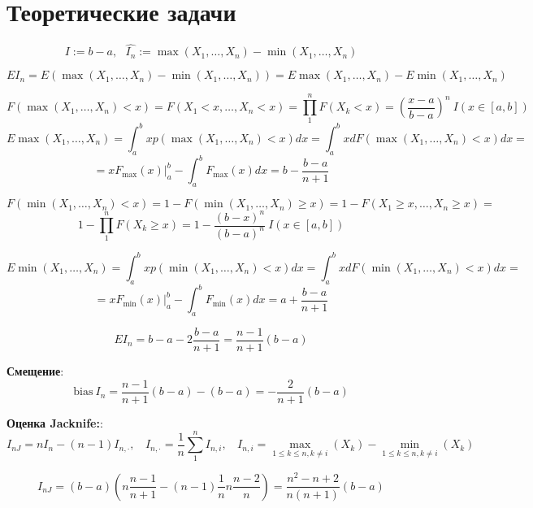 \documentclass[12pt]{extreport}
\theoremstyle{definiton}
\theoremstyle{definition}
\theoremstyle{definition}
\newcounter{problem}
\renewcommand{\theproblem}{\arabic{problem}}
\newcommand{\problemname}{\color{blue} Задача}
\newenvironment{problem}[1]{
	\addtocounter{problem}{1}\noindent{\large\bfseries \problemname{} \theproblem \,.
		}
}{
	\par\bigskip
}
\begin{document}
	
\section*{Теоретические задачи}

\begin{problem}{}
$$
I := b - a, \ \ \ \hat{I_n} := \max(X_1, \ldots, X_n) - \min(X_1, \ldots, X_n)
$$

$$ E I_n = E \left(\max\left(X_1, \ldots, X_n\right) - \min\left(X_1, \ldots, X_n\right)\right) = E \max(X_1, \ldots, X_n) - E \min(X_1, \ldots, X_n)$$

$$ F(\max(X_1, \ldots, X_n) < x) = F(X_1 < x, \ldots, X_n < x) = \prod_{1}^n F(X_k < x) = \left(\frac{x-a}{b-a}\right)^n \ I(x \in [a, b])$$
$$ E \max(X_1, \ldots, X_n) = \int_{a}^b x p(\max(X_1, \ldots, X_n) < x) dx = \int_{a}^b x d F(\max(X_1, \ldots, X_n) < x) dx = $$
$$ = xF_{\max}(x) \Big|_a^b - \int_a^bF_{\max}(x) dx = b - \frac{b-a}{n+1}$$

$$F(\min(X_1, \ldots, X_n) < x) = 1 - F(\min(X_1, \ldots, X_n) \ge x) = 1 - F(X_1 \ge x, \ldots, X_n \ge x) = $$
$$1 - \prod_{1}^n F(X_k \ge x) = 1 - \frac{(b-x)^n}{(b-a)^n} \ I(x \in [a, b])$$

$$ E \min(X_1, \ldots, X_n) = \int_{a}^b x p(\min(X_1, \ldots, X_n) < x) dx = \int_{a}^b x d F(\min(X_1, \ldots, X_n) < x) dx = $$
$$ = xF_{\min}(x) \Big|_a^b - \int_a^bF_{\min}(x) dx = a + \frac{b-a}{n+1}$$

$$E I_n = b - a - 2\frac{b-a}{n+1} = \frac{n-1}{n+1} (b-a)$$

\textbf{Смещение}:
$$\mathrm{bias}\ I_n = \frac{n-1}{n+1} (b-a) - (b-a) = -\frac{2}{n+1} (b-a)$$


\textbf{Оценка Jacknife:}:
$$I_{nJ} = n I_n - (n-1) I_{n,\cdot}, \ \ \ \ I_{n,\cdot} = \frac{1}{n}\sum_1^n I_{n,i}, \ \ \ \ 
I_{n,i}= \max_{1 \le k \le n, k \ne i}(X_k) - \min_{1 \le k \le n, k \ne i}(X_k)$$

$$I_{nJ} = (b-a) \left( n \frac{n-1}{n+1} - (n-1) \frac{1}{n} n \frac{n-2}{n} \right) = \frac{n^2 - n + 2}{n(n+1)}(b-a)$$
\end{problem}
\end{document}
